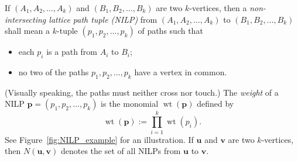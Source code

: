 \documentclass[reqno]{amsart}
\newcommand{\0}{\phantom{c}}
\DeclareMathOperator{\wt}{wt} %
\newcommand{\pp}{\mathbf{p}}
\newcommand{\uu}{\mathbf{u}}
\newcommand{\vv}{\mathbf{v}}
\let\sumnonlimits\sum
\let\prodnonlimits\prod
\renewcommand{\sum}{\sumnonlimits\limits}
\renewcommand{\prod}{\prodnonlimits\limits}
\newcommand{\set}[1]{\left\{ #1 \right\}}
\newcommand{\tup}[1]{\left( #1 \right)}
\newcommand{\defn}[1]{{\color{darkred}\emph{#1}}} %
\theoremstyle{plain}
\theoremstyle{definition}
\numberwithin{equation}{section}
\begin{document}
\begin{comment}
We begin with a proof of~\eqref{eq.LGV.single-paths}, which is a simple and classical fact that appears implicitly in various texts on enumerative combinatorics (\textit{e.g.}, \cite[(2.36)]{Stanley-EC1}).

\begin{proof}[Proof of~\eqref{eq.LGV.single-paths}.]
Let $A = (a,b)$ and $B = (c,d)$ be two vertices.
If $p$ is a path from $A$ to $B$, then $p$ must have exactly $c-a$ east-steps, and the $y$-coordinates of these
east-steps must belong to the interval $\set{b,b+1,\dotsc,d}$.
Let $\bigl( y_1(p), y_2(p), \dotsc, y_{c-a}(p) \bigr) \in \set{b,b+1, \dotsc, d}^{c-a}$ be the weakly increasing $(c-a)$-tuple consisting of the $y$-coordinates of the $c-a$ east-steps of $p$ (from left to right).
Moreover, $p$ can be uniquely reconstructed from this $(c-a)$-tuple (since this $(c-a)$-tuple determines the east-steps of $p$).
Conversely, any weakly increasing $(c-a)$-tuple of elements of $\set{b, b+1, \dotsc,d}$ has the form $\bigl( y_1(p), y_2(p), \dotsc, y_{c-a}(p) \bigr)$ for a unique path $p$ from $A$ to $B$.
Thus, there is a bijection between the paths $p$ from $A$ to $B$ and the weakly increasing $(c-a)$-tuples of elements of $\set{b, b+1, \dotsc, d}$.
This yields
\begin{align*}
\sum_{p \in N(A,B)} \wt(p) & = \sum_{\substack{ \tup{k_1,k_2,\ldots,k_{c-a}} \text{ is a weakly increasing} \\ (c-a)\text{-tuple of elements of }\set{b,b+1,\dotsc,d} }} x_{k_1} x_{k_2} \cdots x_{k_{c-a}}
\\ & = h_{c-a}(x_{b}, x_{b+1}, \dotsc, x_{d}).
\end{align*}
\end{proof}
\end{comment}

If $\tup{A_1, A_2, \dotsc, A_k}$ and $\tup{B_1, B_2, \dotsc, B_k}$ are two $k$-vertices, then a \defn{non-intersecting lattice path tuple (NILP)} from $\tup{A_1, A_2, \dotsc, A_k}$ to $\tup{B_1, B_2, \dotsc, B_k}$ shall mean a $k$-tuple $\tup{p_1, p_2, \dotsc, p_k}$ of paths such that
\begin{itemize}
\item each $p_i$ is a path from $A_i$ to $B_i$;
\item no two of the paths $p_1, p_2, \dotsc, p_k$ have a vertex in common.
\end{itemize}
(Visually speaking, the paths must neither cross nor touch.)
The \defn{weight} of a NILP $\pp = \tup{p_1, p_2, \dotsc, p_k}$ is the monomial $\wt(\pp)$ defined by
\[
\wt(\pp) := \prod_{i=1}^{k} \wt(p_i).
\]
See Figure~\ref{fig:NILP_example} for an illustration.
If $\uu$ and $\vv$ are two $k$-vertices, then \defn{$N(\uu,\vv)$} denotes the set of all NILPs from $\uu$ to $\vv$.
\end{document}

